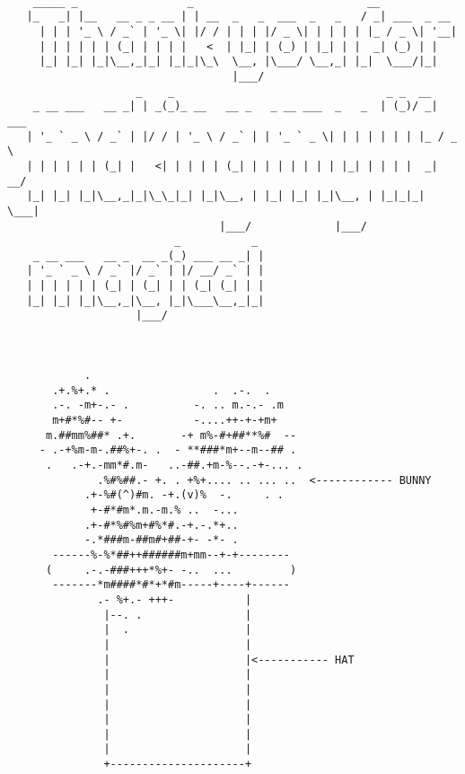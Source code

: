 \documentclass[a4paper,english]{article}
\begin{document}
\pagebreak

\begin{verbatim}

    _____ _                 _                           __
   |_   _| |__   __ _ _ __ | | __  _   _  ___  _   _   / _| ___  _ __
     | | | '_ \ / _` | '_ \| |/ / | | | |/ _ \| | | | | |_ / _ \| '__|
     | | | | | | (_| | | | |   <  | |_| | (_) | |_| | |  _| (_) | |
     |_| |_| |_|\__,_|_| |_|_|\_\  \__, |\___/ \__,_| |_|  \___/|_|
                                   |___/
                    _    _                                 _ _  __
    _ __ ___   __ _| | _(_)_ __   __ _   _ __ ___  _   _  | (_)/ _| ___
   | '_ ` _ \ / _` | |/ / | '_ \ / _` | | '_ ` _ \| | | | | | | |_ / _ \
   | | | | | | (_| |   <| | | | | (_| | | | | | | | |_| | | | |  _|  __/
   |_| |_| |_|\__,_|_|\_\_|_| |_|\__, | |_| |_| |_|\__, | |_|_|_|  \___|
                                 |___/             |___/
                          _           _
    _ __ ___   __ _  __ _(_) ___ __ _| |
   | '_ ` _ \ / _` |/ _` | |/ __/ _` | |
   | | | | | | (_| | (_| | | (_| (_| | |
   |_| |_| |_|\__,_|\__, |_|\___\__,_|_|
                    |___/


                                                                  
            .                                                     
       .+.%+.* .                .  .-.  .                         
       .-. -m+-.- .          -. .. m.-.- .m                       
       m+#*%#-- +-           -....++-+-+m+                        
      m.##mm%##* .+.       -+ m%-#+##**%#  --                     
     - .-+%m-m-.##%+-. .  - **###*m+--m--## .                     
      .   .-+.-mm*#.m-   ..-##.+m-%--.-+-... .                    
              .%#%##.- +. . +%+.... .. ... ..  <------------ BUNNY
            .+-%#(^)#m. -+.(v)%  -.     . .
             +-#*#m*.m.-m.% ..  -...
            .+-#*%#%m+#%*#.-+.-.*+..
            -.*###m-##m#+##-+- -*- .
       ------%-%*##++######m+mm--+-+--------
      (     .-.-###+++*%+- -..  ...         )
       -------*m####*#*+*#m-----+----+------
              .- %+.- +++-           |
               |--. .                |
               |  .                  |
               |                     |
               |                     |<----------- HAT
               |                     |
               |                     |
               |                     |
               |                     |
               |                     |
               |                     |
               +---------------------+

\end{verbatim}
\end{document}
